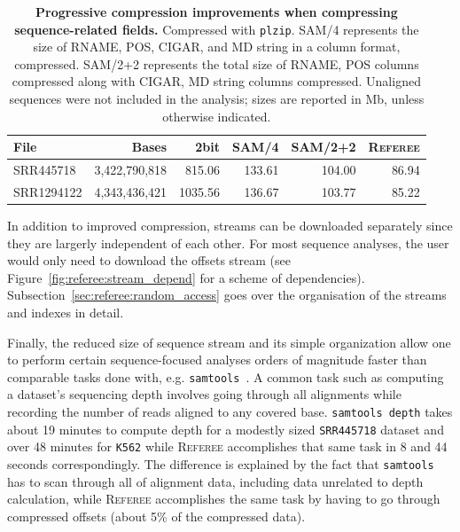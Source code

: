 \documentclass[12pt]{cmuthesis}
\newcommand{\refer}{\textsc{Referee}\xspace}
\begin{document}
  \begin{table}
    \centering
    \begin{tabular}{l r r r r r }
      \toprule
      File & Bases & 2bit & SAM/4 & SAM/2+2 & \refer \\
      \midrule
      SRR445718   & 3,422,790,818 & 815.06 & 133.61 & 104.00 & 86.94 \\
      SRR1294122  & 4,343,436,421 & 1035.56 & 136.67 & 103.77 & 85.22 \\
      \bottomrule
    \end{tabular}
    \caption{\textbf{Progressive compression improvements when compressing sequence-related fields.} Compressed with \texttt{plzip}. SAM/4 represents the size of RNAME, POS, CIGAR, and MD string in a column format, compressed. SAM/2+2 represents the total size of RNAME, POS columns compressed along with CIGAR, MD string columns compressed. Unaligned sequences were not included in the analysis; sizes are reported in Mb, unless otherwise indicated.}
    \label{referee:table:progressive_enc}
  \end{table}

  In addition to improved compression, streams can be downloaded separately since they are largerly independent of each other. For most sequence analyses, the user would only need to download the offsets stream (see Figure~\ref{fig:referee:stream_depend} for a scheme of dependencies). Subsection~\ref{sec:referee:random_access} goes over the organisation of the streams and indexes in detail.

  Finally, the reduced size of sequence stream and its simple organization allow one to perform certain sequence-focused analyses orders of magnitude faster than comparable tasks done with, e.g. \texttt{samtools}~\cite{SamTools}. A common task such as computing a dataset's sequencing depth involves going through all alignments while recording the number of reads aligned to any covered base. \texttt{samtools depth} takes about 19 minutes to compute depth for a modestly sized \texttt{SRR445718} dataset and over 48 minutes for \texttt{K562} while \refer accomplishes that same task in 8 and 44 seconds correspondingly. The difference is explained by the fact that \texttt{samtools} has to scan through all of alignment data, including data unrelated to depth calculation, while \refer accomplishes the same task by  having to go through compressed offsets (about 5\% of the compressed data).
\end{document}
